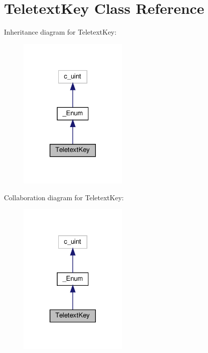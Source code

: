 \hypertarget{classvlc_1_1_teletext_key}{}\section{Teletext\+Key Class Reference}
\label{classvlc_1_1_teletext_key}


Inheritance diagram for Teletext\+Key\+:
\nopagebreak
\begin{figure}[H]
\begin{center}
\leavevmode
\includegraphics[width=149pt]{classvlc_1_1_teletext_key__inherit__graph}
\end{center}
\end{figure}


Collaboration diagram for Teletext\+Key\+:
\nopagebreak
\begin{figure}[H]
\begin{center}
\leavevmode
\includegraphics[width=149pt]{classvlc_1_1_teletext_key__coll__graph}
\end{center}
\end{figure}
